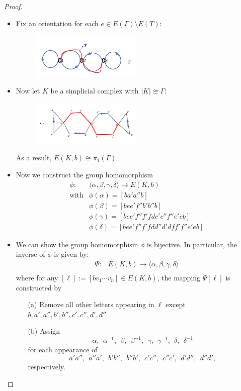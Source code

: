 \begin{proof}
\begin{itemize}
\item
Fix an orientation for each $e\in E(\Gamma)\setminus E(T)$:
\begin{figure}[H]
\centering
\includegraphics[width=0.5\textwidth]{week15/f_41}
\end{figure}
\item
Now let $K$ be a simplicial complex with $|K|\cong \Gamma$:
\begin{figure}[H]
\centering
\includegraphics[width=0.5\textwidth]{week15/f_44}
\end{figure}
As a result, $E(K,b)\cong\pi_1(\Gamma)$
\item
Now we construct the group homomorphism
\[
\begin{array}{ll}
\phi:&\langle\alpha,\beta,\gamma,\delta\rangle\to E(K,b)\\
\text{with}&\phi(\alpha)=[ba'a''b]\\
&\phi(\beta)=[bee'f''b'b''b]\\
&\phi(\gamma)=[bee'f''f'fdc'c''f''e'eb]\\
&\phi(\delta)=[bee'f''f'fdd''d'dff'f''e'eb]
\end{array}
\]
\item
We can show the group homomorphism $\phi$ is bijective. In particular, the inverse of $\phi$ is given by:
\[
\begin{array}{ll}
\Psi:&E(K,b)\to\langle\alpha,\beta,\gamma,\delta\rangle\\
\end{array}
\]
where for any $[\ell]:=[bv_1\cdots v_n]\in E(K,b)$, the mapping $\Psi[\ell]$ is constructed by
\begin{enumerate}
\item[(a)]
Remove all other letters appearing in $\ell$ except $b,a',a'',b',b'',c',c'',d',d''$
\item[(b)]
Assign 
\[
\alpha,~~\alpha^{-1},~~\beta,~~\beta^{-1},~~\gamma,~~\gamma^{-1},~~\delta,~~\delta^{-1}
\]
for each appearance of 
\[
a'a'',~~a''a',~~b'b'',~~b''b',~~c'c'',~~c''c',~~d'd'',~~d''d',
\] 
respectively.
\end{enumerate}


\end{itemize}
\end{proof}





